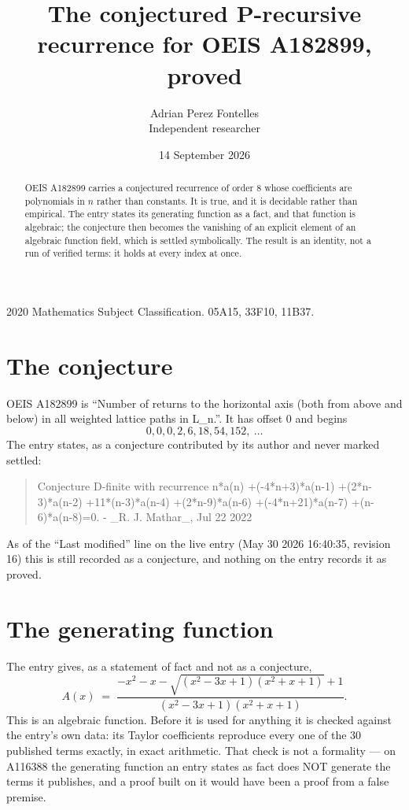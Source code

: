 \documentclass[11pt,a4paper]{article}
\title{The conjectured P-recursive recurrence for OEIS A182899, proved}
\author{Adrian Perez Fontelles\\ \small Independent researcher}
\date{14 September 2026}
\theoremstyle{plain}
\theoremstyle{definition}
\begin{document}
\maketitle

\begin{abstract}
OEIS A182899 carries a conjectured recurrence of order $8$ whose coefficients are polynomials in
$n$ rather than constants. It is true, and it is decidable rather than empirical. The entry
states its generating function as a fact, and that function is algebraic; the conjecture then
becomes the vanishing of an explicit element of an algebraic function field, which is settled
symbolically. The result is an identity, not a run of verified terms: it holds at every index
at once.
\end{abstract}

\noindent\small 2020 Mathematics Subject Classification. 05A15, 33F10, 11B37.\normalsize

\section{The conjecture}

OEIS A182899 is ``Number of returns to the horizontal axis (both from above and below) in all weighted lattice paths in L\_n.''. It has offset $0$ and begins
\[
0, 0, 0, 2, 6, 18, 54, 152,\ \dots
\]
The entry states, as a conjecture contributed by its author and never marked settled:
\begin{quote}\raggedright\small
Conjecture D-finite with recurrence n*a(n) +(-4*n+3)*a(n-1) +(2*n-3)*a(n-2) +11*(n-3)*a(n-4) +(2*n-9)*a(n-6) +(-4*n+21)*a(n-7) +(n-6)*a(n-8)=0. - \_R. J. Mathar\_, Jul 22 2022
\end{quote}
As of the ``Last modified'' line on the live entry (May 30 2026 16:40:35, revision 16)
this is still recorded as a conjecture, and nothing on the entry records it as proved.

\section{The generating function}

The entry gives, as a statement of fact and not as a conjecture,
\[
A(x)\;=\;\frac{- x^{2} - x - \sqrt{\left(x^{2} - 3 x + 1\right) \left(x^{2} + x + 1\right)} + 1}{\left(x^{2} - 3 x + 1\right) \left(x^{2} + x + 1\right)} .
\]
This is an algebraic function. Before it is used for anything it is checked against the entry's
own data: its Taylor coefficients reproduce every one of the $30$ published terms
exactly, in exact arithmetic. That check is not a formality --- on A116388 the generating
function an entry states as fact does NOT generate the terms it publishes, and a proof built on
it would have been a proof from a false premise.
\end{document}
